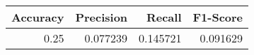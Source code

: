 \begin{tabular}{rrrr}
\toprule
 Accuracy &  Precision &   Recall &  F1-Score \\
\midrule
     0.25 &   0.077239 & 0.145721 &  0.091629 \\
\bottomrule
\end{tabular}
